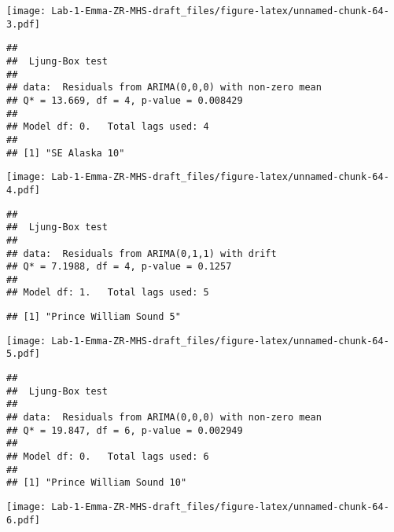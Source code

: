 \documentclass[
]{article}
\newenvironment{Shaded}{\begin{snugshade}}{\end{snugshade}}
\newcommand{\CommentTok}[1]{\textcolor[rgb]{0.56,0.35,0.01}{\textit{#1}}}
\newcommand{\ControlFlowTok}[1]{\textcolor[rgb]{0.13,0.29,0.53}{\textbf{#1}}}
\newcommand{\DecValTok}[1]{\textcolor[rgb]{0.00,0.00,0.81}{#1}}
\newcommand{\FunctionTok}[1]{\textcolor[rgb]{0.00,0.00,0.00}{#1}}
\newcommand{\NormalTok}[1]{#1}
\newcommand{\OtherTok}[1]{\textcolor[rgb]{0.56,0.35,0.01}{#1}}
\newcommand{\SpecialCharTok}[1]{\textcolor[rgb]{0.00,0.00,0.00}{#1}}
\begin{document}
\texttt{[image: Lab-1-Emma-ZR-MHS-draft\_files/figure-latex/unnamed-chunk-64-3.pdf]}

\begin{verbatim}
## 
##  Ljung-Box test
## 
## data:  Residuals from ARIMA(0,0,0) with non-zero mean
## Q* = 13.669, df = 4, p-value = 0.008429
## 
## Model df: 0.   Total lags used: 4
## 
## [1] "SE Alaska 10"
\end{verbatim}

\texttt{[image: Lab-1-Emma-ZR-MHS-draft\_files/figure-latex/unnamed-chunk-64-4.pdf]}

\begin{verbatim}
## 
##  Ljung-Box test
## 
## data:  Residuals from ARIMA(0,1,1) with drift
## Q* = 7.1988, df = 4, p-value = 0.1257
## 
## Model df: 1.   Total lags used: 5
\end{verbatim}

\begin{Shaded}
\end{Shaded}

\begin{verbatim}
## [1] "Prince William Sound 5"
\end{verbatim}

\texttt{[image: Lab-1-Emma-ZR-MHS-draft\_files/figure-latex/unnamed-chunk-64-5.pdf]}

\begin{verbatim}
## 
##  Ljung-Box test
## 
## data:  Residuals from ARIMA(0,0,0) with non-zero mean
## Q* = 19.847, df = 6, p-value = 0.002949
## 
## Model df: 0.   Total lags used: 6
## 
## [1] "Prince William Sound 10"
\end{verbatim}

\texttt{[image: Lab-1-Emma-ZR-MHS-draft\_files/figure-latex/unnamed-chunk-64-6.pdf]}
\end{document}
